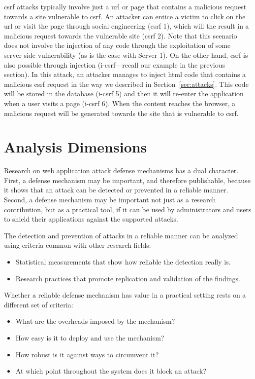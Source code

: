 \documentclass[10pt,journal,compsoc]{IEEEtran}
\begin{document}
{\sc csrf} attacks typically involve just a
{\sc url} or page that contains a malicious request towards
a site vulnerable to {\sc csrf}.
An attacker can entice a victim to click on the {\sc url} or visit the page
through social engineering ({\sc csrf} 1), which will the result in a malicious
request towards the vulnerable site ({\sc csrf} 2).
Note that this scenario does not involve the injection of any code through the
exploitation of some server-side vulnerability (as is the case with Server 1).
On the other hand, {\sc csrf} is also possible through injection
({\sc i-csrf}---recall our example in the previous section).
In this attack, an attacker
manages to inject {\sc html} code that contains
a malicious {\sc csrf} request in the way we described in
Section~\ref{sec:attacks}.
This code will be stored
in the database ({\sc i-csrf} 5)
and then it will re-enter the application when
a user visits a page ({\sc i-csrf} 6). When the
content reaches the browser, a malicious request will be generated
towards the site that is vulnerable to {\sc csrf}.

\section{Analysis Dimensions}
\label{sec:dimensions}

Research on web application attack defense mechanisms has a dual
character. First, a defense mechanism may be important, and therefore
publishable, because it shows that an attack can be detected or prevented in a
reliable manner. Second, a defense mechanism may be important not
just as a research contribution, but as a practical tool, if it can be
used by administrators and users to shield their applications
against the supported attacks.

The detection and prevention of attacks
in a reliable manner can be analyzed using
criteria common with other research fields:
\begin{itemize}
\vspace{-1mm}
\item Statistical measurements that show how
reliable the detection really is.
\item Research practices that promote replication and validation
of the findings.
\vspace{-1mm}
\end{itemize}
\noindent
Whether a reliable defense mechanism has value in a practical
setting rests on a different set of criteria:
\begin{itemize}
\vspace{-0.5mm}
\item What are the overheads imposed by the mechanism?
\item How easy is it to deploy and use the mechanism?
\item How robust is it against ways to circumvent it?
\item At which point throughout the system does it block an attack?
\vspace{-0.5mm}
\end{itemize}
\end{document}
